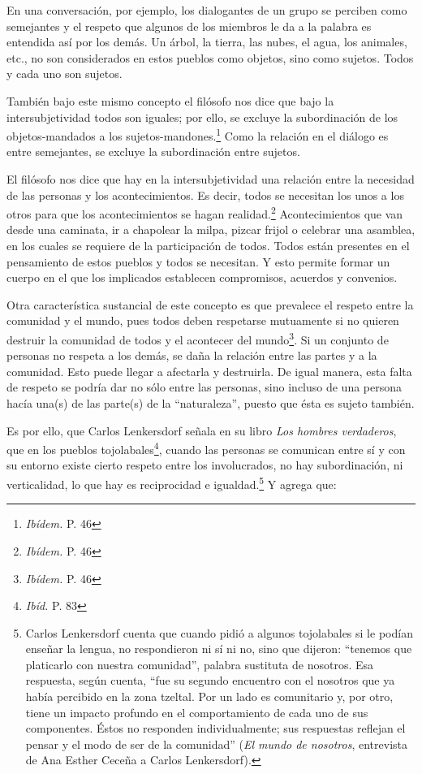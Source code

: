 \documentclass[oneside]{book}
\begin{document}
En una conversación, por ejemplo, los dialogantes de un grupo se perciben como semejantes y el respeto que algunos de los miembros le da a la palabra es entendida así por los demás. Un árbol, la tierra, las nubes, el agua, los animales, etc., no son considerados en estos pueblos como objetos, sino como sujetos. Todos y cada uno son sujetos.

También bajo este mismo concepto el filósofo nos dice que bajo la intersubjetividad todos son iguales; por ello, se excluye la subordinación de los objetos-mandados a los sujetos-mandones.\footnote{\textit{Ibídem.} P. 46} Como la relación en el diálogo es entre semejantes, se excluye la subordinación entre sujetos. 

El filósofo nos dice que hay en la intersubjetividad una relación entre la necesidad de las personas y los acontecimientos. Es decir, todos se necesitan los unos a los otros para que los acontecimientos se hagan realidad.\footnote{\textit{Ibídem.} P. 46} Acontecimientos que van desde una caminata, ir a chapolear la milpa, pizcar frijol o celebrar una asamblea, en los cuales se requiere de la participación de todos. Todos están presentes en el pensamiento de estos pueblos y todos se necesitan. Y esto permite formar un cuerpo en el que los implicados establecen compromisos, acuerdos y convenios.

Otra característica sustancial de este concepto es que prevalece el respeto entre la comunidad y el mundo, pues todos deben respetarse mutuamente si no quieren destruir la comunidad de todos y el acontecer del mundo\footnote{\textit{Ibídem.} P. 46}. Si un conjunto de personas no respeta a los demás, se daña la relación entre las partes y a la comunidad. Esto puede llegar a afectarla y destruirla. De igual manera, esta falta de respeto se podría dar no sólo entre las personas, sino incluso de una persona hacía una(s) de las parte(s) de la “naturaleza”, puesto que ésta es sujeto también.

Es por ello, que Carlos Lenkersdorf señala en su libro \textit{Los hombres verdaderos}, que en los pueblos tojolabales\footnote{\textit{Ibíd.} P. 83}, cuando las personas se comunican entre sí y con su entorno existe cierto respeto entre los involucrados, no hay subordinación, ni verticalidad, lo que hay es reciprocidad e igualdad.\footnote{Carlos Lenkersdorf cuenta que cuando pidió a algunos tojolabales si le podían enseñar la lengua, no respondieron ni sí ni no, sino que dijeron: “tenemos que platicarlo con nuestra comunidad”, palabra sustituta de nosotros. Esa respuesta, según cuenta, “fue su segundo encuentro con el nosotros que ya había percibido en la zona tzeltal. Por un lado es comunitario y, por otro, tiene un impacto profundo en el comportamiento de cada uno de sus componentes. Éstos no responden individualmente; sus respuestas reflejan el pensar y el modo de ser de la comunidad” (\textit{El mundo de nosotros}, entrevista de Ana Esther Ceceña a Carlos Lenkersdorf).} Y agrega que:
\end{document}
